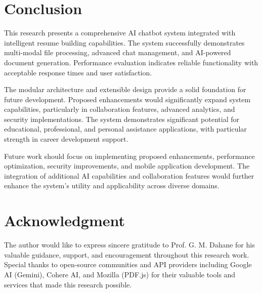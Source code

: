 \documentclass[conference]{IEEEtran}
\begin{document}
\section{Conclusion}
This research presents a comprehensive AI chatbot system integrated with intelligent resume building capabilities. The system successfully demonstrates multi-modal file processing, advanced chat management, and AI-powered document generation. Performance evaluation indicates reliable functionality with acceptable response times and user satisfaction.

The modular architecture and extensible design provide a solid foundation for future development. Proposed enhancements would significantly expand system capabilities, particularly in collaboration features, advanced analytics, and security implementations. The system demonstrates significant potential for educational, professional, and personal assistance applications, with particular strength in career development support.

Future work should focus on implementing proposed enhancements, performance optimization, security improvements, and mobile application development. The integration of additional AI capabilities and collaboration features would further enhance the system's utility and applicability across diverse domains.

\section*{Acknowledgment}
The author would like to express sincere gratitude to Prof. G. M. Dahane for his valuable guidance, support, and encouragement throughout this research work. Special thanks to open-source communities and API providers including Google AI (Gemini), Cohere AI, and Mozilla (PDF.js) for their valuable tools and services that made this research possible.
\end{document}
